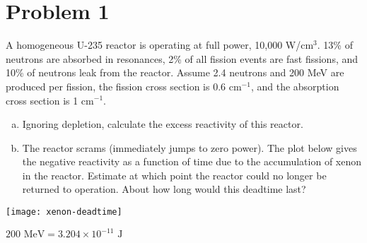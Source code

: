 \section*{Problem 1}

A homogeneous U-235 reactor is operating at full power, 10,000 W/cm$^3$. 13\% of neutrons are absorbed in resonances, 2\% of all fission events are fast fissions, and 10\% of neutrons leak from the reactor. Assume 2.4 neutrons and 200 MeV are produced per fission, the fission cross section is 0.6 cm$^{-1}$, and the absorption cross section is 1 cm$^{-1}$.
\begin{enumerate}[a)]
\item Ignoring depletion, calculate the excess reactivity of this reactor.
\item The reactor scrams (immediately jumps to zero power). The plot below gives the negative reactivity as a function of time due to the accumulation of xenon in the reactor. Estimate at which point the reactor could no longer be returned to operation. About how long would this deadtime last?
\end{enumerate}
\begin{center}
\vspace{1cm}
\texttt{[image: xenon-deadtime]}
\end{center}
\vfill
$200\text{ MeV} = 3.204\times10^{-11}\text{ J}$


